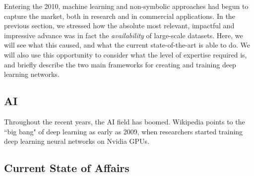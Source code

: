 \documentclass[../main.tex]{subfiles}
\begin{document}
Entering the 2010, machine learning and non-symbolic approaches had begun to capture the market, both in research and in commercial applications. In the previous section, we stressed how the absolute most relevant, impactful and impressive advance was in fact the \textit{availability} of large-scale datasets. Here, we will see what this caused, and what the current state-of-the-art is able to do. We will also use this opportunity to consider what the level of expertise required is, and briefly describe the two main frameworks for creating and training deep learning networks.

\subsection{AI}
Throughout the recent years, the AI field has boomed. Wikipedia points to the ``big bang" of deep learning as early as 2009, when researchers started training deep learning neural networks on Nvidia GPUs.




\subsection{Current State of Affairs}
\end{document}
